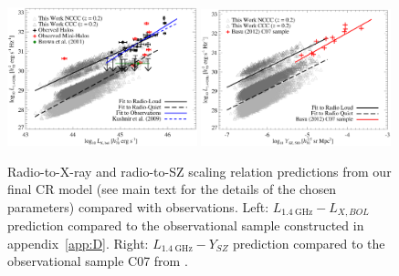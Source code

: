 \documentclass[traditabstract]{aa}
\newcommand{\rmn}{\mathrm}
\begin{document}
\begin{figure}[hbt!]
\centering
\includegraphics[width=0.49\textwidth]{figures/PL_relation.eps}
\includegraphics[width=0.49\textwidth]{figures/PSZ_relation.eps}
\caption{Radio-to-X-ray and radio-to-SZ scaling relation predictions from our final CR model (see main text for the details of the chosen parameters) compared with observations.
Left: $L_{1.4~\rmn{GHz}}-L_{X, BOL}$ prediction compared to the observational sample constructed in appendix~\ref{app:D}. Right: $L_{1.4~\rmn{GHz}}-Y_{SZ}$ prediction compared to the observational sample C07 from \cite{2012MNRAS.421L.112B}.}
\label{fig:PLSZ}
\end{figure}
 
\end{document}
